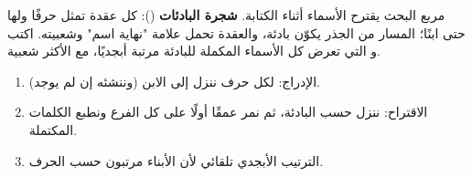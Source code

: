 \begin{statement}
مربع البحث يقترح الأسماء أثناء الكتابة. \textbf{شجرة البادئات} (): كل عقدة تمثل حرفًا ولها حتى  ابنًا؛ المسار من الجذر يكوّن بادئة، والعقدة تحمل علامة "نهاية اسم" وشعبيته. اكتب  و  التي تعرض كل الأسماء المكملة للبادئة مرتبة أبجديًا، مع الأكثر شعبية.
\end{statement}
\begin{stepsbox}\begin{enumerate}
\item الإدراج: لكل حرف ننزل إلى الابن  (وننشئه إن لم يوجد).
\item الاقتراح: ننزل حسب البادئة، ثم نمر عمقًا أولًا على كل الفرع ونطبع الكلمات المكتملة.
\item الترتيب الأبجدي تلقائي لأن الأبناء مرتبون حسب الحرف.
\end{enumerate}\end{stepsbox}
